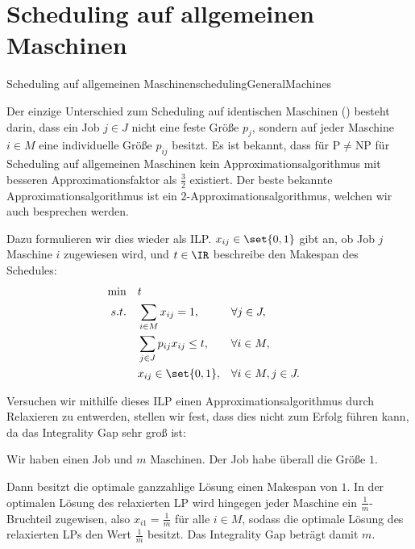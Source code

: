 \documentclass[language=ngerman,algolist]{TemplateLecture}
\begin{document}

\section{Scheduling auf allgemeinen Maschinen}

\begin{prob}{Scheduling auf allgemeinen Maschinen}{schedulingGeneralMachines}
\end{prob}
Der einzige Unterschied zum Scheduling auf identischen Maschinen () besteht  darin, dass ein Job $j \in J$ nicht eine feste Größe $p_j$, sondern auf jeder Maschine $i \in M$ eine individuelle Größe $p_{ij}$ besitzt. Es ist bekannt, dass für P$\neq$NP für Scheduling auf allgemeinen Maschinen kein Approximationsalgorithmus mit besseren Approximationsfaktor als $\frac{3}{2}$ existiert. Der beste bekannte Approximationsalgorithmus ist ein $2$-Approximationsalgorithmus, welchen wir auch besprechen werden.

Dazu formulieren wir dies wieder als ILP. $x_{ij} \in \set{0,1}$ gibt an, ob Job $j$ Maschine $i$ zugewiesen wird, und $t \in \IR$ beschreibe den Makespan des Schedules:
\begin{align*}
    \min \quad & t \\ 
    s.t. \quad & \sum_{i \in M} x_{ij} = 1, && \forall j \in J, \\ 
    & \sum_{j \in J} p_{ij} x_{ij} \leq t, && \forall i \in M, \\
    & x_{ij} \in \set{0,1}, && \forall i \in M, j \in J.
\end{align*}

Versuchen wir mithilfe dieses ILP einen Approximationsalgorithmus durch Relaxieren zu entwerden, stellen wir fest, dass dies nicht zum Erfolg führen kann, da das Integrality Gap sehr groß ist:

\begin{expl}
    Wir haben einen Job und $m$ Maschinen. Der Job habe überall die Größe $1$.

    Dann besitzt die optimale ganzzahlige Lösung einen Makespan von $1$. In der optimalen Lösung des relaxierten LP wird hingegen jeder Maschine ein $\frac{1}{m}$-Bruchteil zugewisen, also $x_{i1} = \frac{1}{m}$ für alle $i \in M$, sodass die optimale Lösung des relaxierten LPs den Wert $\frac{1}{m}$ besitzt. Das Integrality Gap beträgt damit $m$.
\end{expl}
\end{document}
